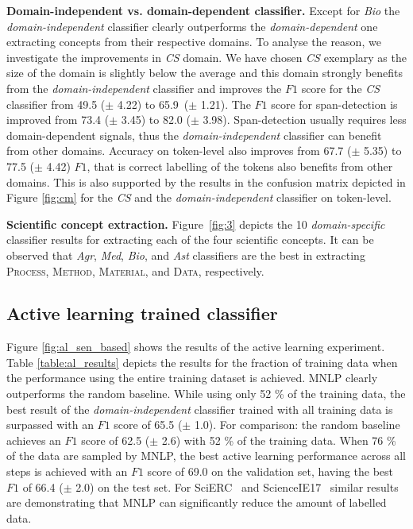 \documentclass[runningheads]{llncs}
\begin{document}
\textbf{Domain-independent vs. domain-dependent classifier.}
Except for \textit{Bio} the \textit{domain-independent} classifier clearly outperforms the \textit{domain-dependent} one extracting concepts from their respective domains. To analyse the reason, we investigate the improvements in \textit{CS} domain. We have chosen \textit{CS} exemplary as the size of the domain is slightly below the average and this domain strongly benefits from the \textit{domain-independent} classifier and improves the $F1$ score for the \textit{CS} classifier from 49.5 ($\pm$ 4.22) to 65.9~($\pm$ 1.21). The $F1$ score for span-detection is improved from 73.4 ($\pm$ 3.45) to 82.0 ($\pm$ 3.98). Span-detection usually requires less domain-dependent signals, thus the \textit{domain-independent} classifier can benefit from other domains. 
Accuracy on token-level also improves from 67.7 ($\pm$ 5.35) to 77.5 ($\pm$ 4.42) $F1$, that is correct labelling of the tokens also benefits from other domains. This is also supported by the results in the confusion matrix depicted in Figure \ref{fig:cm} for the \textit{CS} and the \textit{domain-independent} classifier on token-level. 

\textbf{Scientific concept extraction.} 
Figure~\ref{fig:3} depicts the 10 \textit{domain-specific} classifier results for extracting each of the four scientific concepts.
It can be observed that \textit{Agr}, \textit{Med}, \textit{Bio}, and \textit{Ast} classifiers are the best in extracting \textsc{Process}, \textsc{Method}, \textsc{Material}, and \textsc{Data}, respectively.


\subsection{Active learning trained classifier}

Figure \ref{fig:al_sen_based} shows the results of the active learning experiment.
Table \ref{table:al_results} depicts the results for the fraction of training data when the performance using the entire training dataset is achieved. MNLP clearly outperforms the random baseline. While using only 52 \% of the training data, the best result of the \textit{domain-independent} classifier trained with all training data is surpassed with an $F1$ score of 65.5 ($\pm$ 1.0). For comparison: the random baseline achieves an $F1$ score of 
62.5 ($\pm$ 2.6) with 52 \% of the training data. 
When 76 \% of the data are sampled by MNLP, the best active learning performance across all steps is achieved with an 
$F1$ score of 69.0 on the validation set, having the best $F1$ of
66.4 ($\pm$ 2.0) on the test set. 
For SciERC~\cite{Luan2018MultiTaskIO} and ScienceIE17~\cite{augenstein2017semeval} similar results are demonstrating that MNLP can significantly reduce the amount of labelled data.
\end{document}
